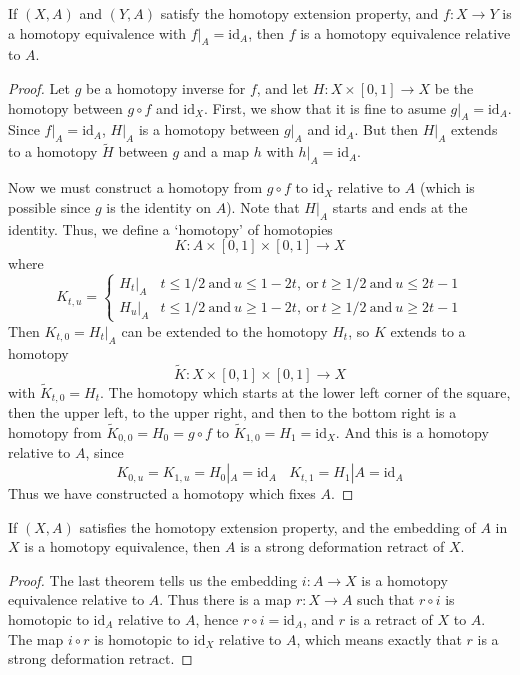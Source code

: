 \begin{theorem}
    If $(X,A)$ and $(Y,A)$ satisfy the homotopy extension property, and $f:X \to Y$ is a homotopy equivalence with $f|_A = \text{id}_A$, then $f$ is a homotopy equivalence relative to $A$.
\end{theorem}
\begin{proof}
    Let $g$ be a homotopy inverse for $f$, and let $H: X \times [0,1] \to X$ be the homotopy between $g \circ f$ and $\text{id}_X$. First, we show that it is fine to asume $g|_A = \text{id}_A$. Since $f|_A = \text{id}_A$, $H|_A$ is a homotopy between $g|_A$ and $\text{id}_A$. But then $H|_A$ extends to a homotopy $\tilde{H}$ between $g$ and a map $h$ with $h|_A = \text{id}_A$.

    Now we must construct a homotopy from $g \circ f$ to $\text{id}_X$ relative to $A$ (which is possible since $g$ is the identity on $A$). Note that $H|_A$ starts and ends at the identity. Thus, we define a `homotopy' of homotopies
    \[ K: A \times [0,1] \times [0,1] \to X \]
    where
    \[ K_{t,u} = \begin{cases} H_t|_A & t \leq 1/2\ \text{and}\ u \leq 1 - 2t,\ \text{or}\ t \geq 1/2\ \text{and}\ u \leq 2t - 1 \\ H_u|_A & t \leq 1/2\ \text{and}\ u \geq 1 - 2t,\ \text{or}\ t \geq 1/2\ \text{and}\ u \geq 2t - 1 \end{cases} \]
    Then $K_{t,0} = H_t|_A$ can be extended to the homotopy $H_t$, so $K$ extends to a homotopy
    \[ \tilde{K}: X \times [0,1] \times [0,1] \to X \]
    with $\tilde{K}_{t,0} = H_t$. The homotopy which starts at the lower left corner of the square, then the upper left, to the upper right, and then to the bottom right is a homotopy from $\tilde{K}_{0,0} = H_0 = g \circ f$ to $\tilde{K}_{1,0} = H_1 = \text{id}_X$. And this is a homotopy relative to $A$, since
    \[ K_{0,u} = K_{1,u} = H_0|_A = \text{id}_A\ \ \ \ K_{t,1} = H_1|A = \text{id}_A \]
    Thus we have constructed a homotopy which fixes $A$.
\end{proof}

\begin{corollary}
    If $(X,A)$ satisfies the homotopy extension property, and the embedding of $A$ in $X$ is a homotopy equivalence, then $A$ is a strong deformation retract of $X$.
\end{corollary}
\begin{proof}
    The last theorem tells us the embedding $i: A \to X$ is a homotopy equivalence relative to $A$. Thus there is a map $r: X \to A$ such that $r \circ i$ is homotopic to $\text{id}_A$ relative to $A$, hence $r \circ i = \text{id}_A$, and $r$ is a retract of $X$ to $A$. The map $i \circ r$ is homotopic to $\text{id}_X$ relative to $A$, which means exactly that $r$ is a strong deformation retract.
\end{proof}

